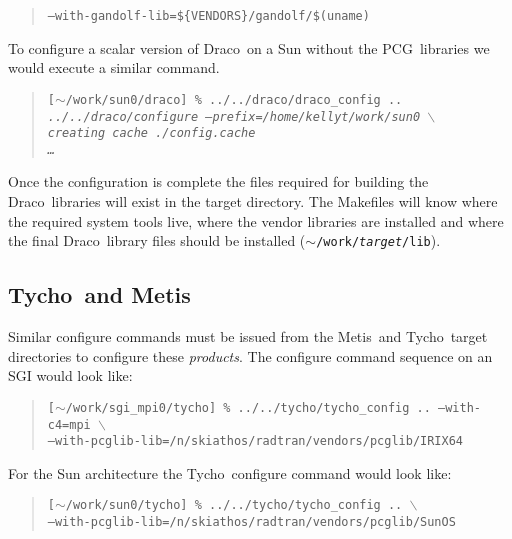 \documentclass[10pt]{nmemo}
\newcommand{\comp}[1]{\normalfont\normalsize\texttt{#1}}
\newcommand{\draco}{{\normalfont\sffamily Draco}}
\newcommand{\tycho}{{\normalfont\sffamily Tycho}}
\newcommand{\metis}{{\normalfont\sffamily Metis}}
\newcommand{\pcg}{{\normalfont\sffamily PCG}}
\begin{document}
\footnotesize
\begin{verse}
\texttt{--with-gandolf-lib=\$\{VENDORS\}/gandolf/\$(uname)}
\end{verse}
\normalsize

To configure a scalar version of \draco\ on a Sun without the \pcg\ 
libraries we would execute a similar command.

\footnotesize
\begin{verse}
\texttt{[$\sim$/work/sun0/draco] \% ../../draco/draco\_config .. \\
\emph{../../draco/configure --prefix=/home/kellyt/work/sun0 $\backslash$\\
\hspace{0.5in}creating cache ./config.cache\\
\hspace{1.0in} \ldots }}
\end{verse}
\normalsize

Once the configuration is complete the files required for building the 
\draco\ libraries will exist in the target directory.  The Makefiles
will know where the required system tools live, where the vendor
libraries are installed and where the final \draco\ library files
should be installed (\comp{$\sim$/work/\emph{target}/lib}).

\subsection{\tycho\ and \metis}

Similar configure commands must be issued from the \metis\ and \tycho\ 
target directories to configure these \emph{products}.  The configure
command sequence on an SGI would look like:

\footnotesize
\begin{verse}
\texttt{[$\sim$/work/sgi\_mpi0/tycho] \% ../../tycho/tycho\_config 
.. --with-c4=mpi $\backslash$\\
\hspace{0.5in}--with-pcglib-lib=/n/skiathos/radtran/vendors/pcglib/IRIX64}
\end{verse}
\normalsize

For the Sun architecture the \tycho\ configure command would look
like:

\footnotesize
\begin{verse}
\texttt{[$\sim$/work/sun0/tycho] \% ../../tycho/tycho\_config 
.. $\backslash$\\
\hspace{0.5in}--with-pcglib-lib=/n/skiathos/radtran/vendors/pcglib/SunOS}
\end{verse}
\normalsize
\end{document}
